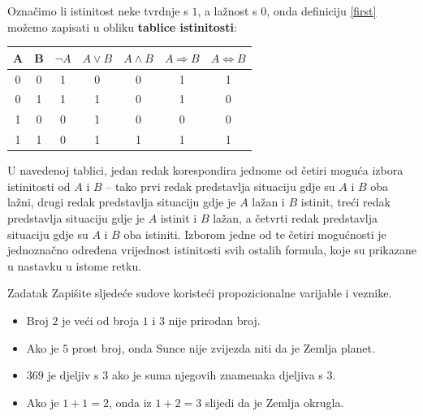 Označimo li istinitost neke tvrdnje s \(1\), a lažnost s \(0\), onda definiciju \ref{first} možemo zapisati u obliku \textbf{tablice istinitosti}:
\begin{center}
\begin{tabular}{ |c|c||c|c|c|c|c| } 
 \hline
 A & B & \(\neg A\) & \(A\vee B\) & \(A\wedge B\) & \(A\Rightarrow B\) & \(A \Leftrightarrow B\) \\
 \hline \hline
 0 & 0 & 1 & 0 & 0 & 1 & 1 \\ 
 0 & 1 & 1 & 1 & 0 & 1 & 0 \\ 
 1 & 0 & 0 & 1 & 0 & 0 & 0 \\
 1 & 1 & 0 & 1 & 1 & 1 & 1 \\
 \hline
\end{tabular}
\end{center}
U navedenoj tablici, jedan redak korespondira jednome od četiri moguća izbora istinitosti od \(A\) i \(B\) -- tako prvi redak predstavlja situaciju gdje su \(A\) i \(B\) oba lažni, drugi redak predstavlja situaciju gdje je \(A\) lažan i \(B\) istinit, treći redak predstavlja situaciju gdje je \(A\) istinit i \(B\) lažan, a četvrti redak predstavlja situaciju gdje su \(A\) i \(B\) oba istiniti. Izborom jedne od te četiri mogućnosti je jednoznačno određena vrijednost istinitosti svih ostalih formula, koje su prikazane u nastavku u istome retku.
\begin{exercise}{Zadatak}
Zapišite sljedeće sudove koristeći propozicionalne varijable i veznike.
\begin{itemize}
\item[a)] Broj \(2\) je veći od broja \(1\) i \(3\) nije prirodan broj.
\item[b)] Ako je \(5\) prost broj, onda Sunce nije zvijezda niti da je Zemlja planet.
\item[c)] \(369\) je djeljiv s \(3\) ako je suma njegovih znamenaka djeljiva s \(3\).
\item[d)] Ako je \(1+1=2\), onda iz \(1+2=3\) slijedi da je Zemlja okrugla.
\end{itemize}
\end{exercise}
